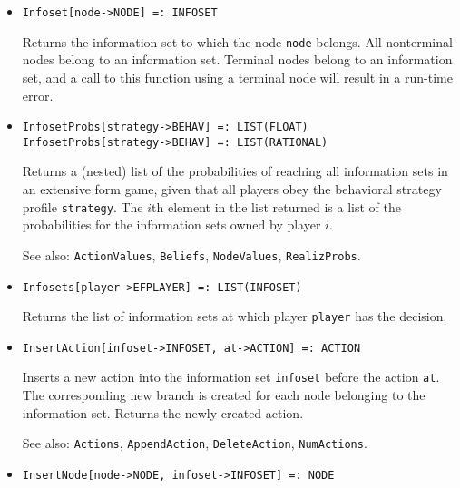 \begin{itemize}
\item
\protect \large \begin{verbatim}
Infoset[node->NODE] =: INFOSET
\end{verbatim}\normalsize

\bd
Returns the information set to which the node \verb+node+
belongs.  All nonterminal nodes belong to an information set.  Terminal
nodes belong to an information set, and a call to this function using
a terminal node will result in a run-time error.
\ed

\item
\protect \large \begin{verbatim}
InfosetProbs[strategy->BEHAV] =: LIST(FLOAT)
InfosetProbs[strategy->BEHAV] =: LIST(RATIONAL)
\end{verbatim}\normalsize

\bd
Returns a (nested) list of the probabilities of reaching all information
sets in an extensive form game, given that all players obey the
behavioral strategy profile \verb+strategy+.  The $i$th element
in the list returned is a list of the probabilities for the information
sets owned by player $i$.
\item
[See also:] {\tt ActionValues}, {\tt Beliefs}, {\tt NodeValues},
{\tt RealizProbs}.
\ed

\item
\protect \large \begin{verbatim}
Infosets[player->EFPLAYER] =: LIST(INFOSET)
\end{verbatim}\normalsize

\bd
Returns the list of information sets at which player
\verb+player+ has the decision.
\ed

\item
\protect \large \begin{verbatim}
InsertAction[infoset->INFOSET, at->ACTION] =: ACTION
\end{verbatim}\normalsize

\bd
Inserts a new action into the information set \verb+infoset+
before the action \verb+at+.  The corresponding new branch is created for
each node belonging to the information set.  Returns the newly created action.
\item
[See also:] {\tt Actions}, {\tt AppendAction}, {\tt DeleteAction},
{\tt NumActions}.
\ed

\item
\protect \large \begin{verbatim}
InsertNode[node->NODE, infoset->INFOSET] =: NODE
\end{verbatim}\normalsize


\end{itemize}
